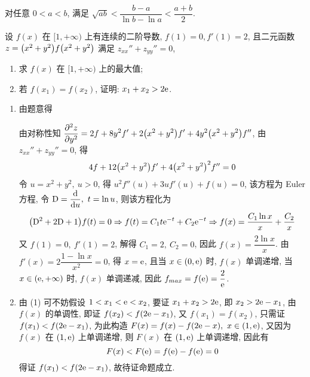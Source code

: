 \begin{theorem}
    对任意 $0<a<b$, 满足 $\sqrt{ab}<\dfrac{b-a}{\ln b-\ln a}<\dfrac{a+b}{2}.$
\end{theorem}
\begin{example}
    设 $f(x)$ 在 $[1,+\infty)$ 上有连续的二阶导数, $f(1)=0,f'(1)=2$, 且二元函数 $z=\qty(x^2+y^2)f\qty(x^2+y^2)$ 满足 $z_{xx}''+z_{yy}''=0$,
    \begin{enumerate}[label=(\arabic{*})]
        \item 求 $f(x)$ 在 $[1,+\infty)$ 上的最大值;
        \item 若 $f(x_1)=f(x_2)$, 证明: $x_1+x_2>2\mathrm{e} $.
    \end{enumerate}
\end{example}
\begin{solution}
    \begin{enumerate}[label=(\arabic{*})]
        \item 由题意得 
        由对称性知 $\displaystyle \pdv[2]{z}{y}=2f+8y^2f'+2\qty(x^2+y^2)f'+4y^2\qty(x^2+y^2)f''$, 由 $z_{xx}''+z_{yy}''=0$, 得 $$
        4f+12\qty(x^2+y^2)f'+4\qty(x^2+y^2)^2f''=0
        $$
        令 $u=x^2+y^2,~u>0$, 得 $u^2 f''(u)+3uf'(u)+f(u)=0$, 该方程为 Euler 方程, 令 $\displaystyle \mathrm{D}=\dv{u},~t=\ln u$, 则该方程化为 $$
        \qty(\mathrm{D}^2+2\mathrm{D}+1)f(t)=0\Rightarrow f(t)=C_1t\mathrm{e} ^{-t}+C_2\mathrm{e} ^{-t}\Rightarrow f(x)=\dfrac{C_1\ln x}{x}+\dfrac{C_2}{x}
        $$
        又 $f(1)=0,~f'(1)=2$, 解得 $C_1=2,~C_2=0$, 因此 $f(x)=\dfrac{2\ln x}{x}$. 由 $f'(x)=2\dfrac{1-\ln x}{x^2}=0$, 得 $x=\mathrm{e}$, 且当 $x\in(0,\mathrm{e})$ 时, $f(x)$ 单调递增, 
        当 $x\in(\mathrm{e},+\infty)$ 时, $f(x)$ 单调递减, 因此 $f_{max}=f(\mathrm{e})=\dfrac{2}{\mathrm{e}}$.
        \item 由 (1) 可不妨假设 $1<x_1<\mathrm{e} <x_2$, 要证 $x_1+x_2>2\mathrm{e}$, 即 $x_2>2\mathrm{e}-x_1$, 由 $f(x)$ 的单调性, 即证 $f(x_2)<f(2\mathrm{e}-x_1)$, 又 $f(x_1)=f(x_2)$, 
        只需证 $f(x_1)<f(2\mathrm{e}-x_1)$, 为此构造 $F(x)=f(x)-f(2\mathrm{e}-x),~x\in(1,\mathrm{e})$, 又因为 $f(x)$ 在 $(1,\mathrm{e})$ 上单调递增, 则 $F(x)$ 在 $(1,\mathrm{e})$ 上单调递增, 因此有 $$F(x)<F(\mathrm{e})=f(\mathrm{e})-f(\mathrm{e})=0$$
        得证 $f(x_1)<f(2\mathrm{e}-x_1)$, 故待证命题成立.
    \end{enumerate}
\end{solution}

